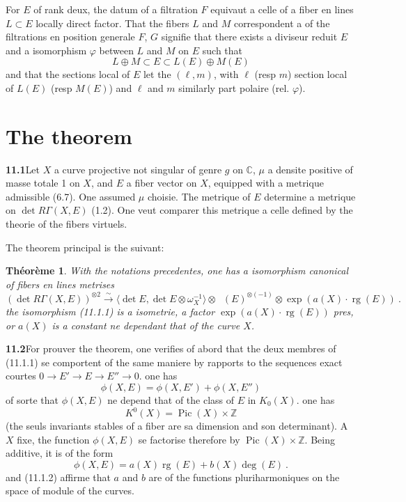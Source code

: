 \documentclass[12pt,a4paper]{article}
\theoremstyle{plain}
\newtheorem{theorem}{Th\'eor\`eme}[section]
\theoremstyle{definition}
\theoremstyle{remark}
\DeclareMathOperator{\Pic}{Pic}
\newcommand{\bbC}{\mathbb{C}}
\newcommand{\bbZ}{\mathbb{Z}}
\DeclareMathOperator{\rg}{rg}
\DeclareMathOperator{\ICtwo}{IC_2}
\newcommand{\simto}{\xrightarrow{\sim}}
\begin{document}
For $E$ of rank deux, the datum of a filtration $F$ equivaut a celle of a fiber en lines $L \subset E$ locally direct factor. That the fibers $L$ and $M$ correspondent a of the filtrations en position generale $F$, $G$ signifie that there exists a diviseur reduit $E$ and a isomorphism $\varphi$ between $L$ and $M$ on $E$ such that
\[
L \oplus M \subset E \subset L(E) \oplus M(E)
\]
and that the sections local of $E$ let the $(\ell, m)$, with $\ell$ (resp $m$) section local of $L(E)$ (resp $M(E)$) and $\ell$ and $m$ similarly part polaire (rel. $\varphi$).


\section{The theorem}

\noindent\textbf{11.1}\quad Let $X$ a curve projective not singular of genre $g$ on $\bbC$, $\mu$ a densite positive of masse totale 1 on $X$, and $E$ a fiber vector on $X$, equipped with a metrique admissible (6.7). One assumed $\mu$ choisie. The metrique of $E$ determine a metrique on $\det R\Gamma(X, E)$ (1.2). One veut comparer this metrique a celle defined by the theorie of the fibers virtuels.

The theorem principal is the suivant:

\begin{theorem}
With the notations precedentes, one has a isomorphism canonical of fibers en lines metrises
\begin{equation}
\label{eq:11.1.1}
(\det R\Gamma(X, E))^{\otimes 2} \simto \langle \det E, \det E \otimes \omega_X^{-1} \rangle \otimes \ICtwo(E)^{\otimes(-1)} \otimes \exp(a(X) \cdot \rg(E)) \ .
\end{equation}
the isomorphism (11.1.1) is a isometrie, a factor $\exp(a(X) \cdot \rg(E))$ pres, or $a(X)$ is a constant ne dependant that of the curve $X$.
\end{theorem}

\medskip
\noindent\textbf{11.2}\quad For prouver the theorem, one verifies of abord that the deux membres of (11.1.1) se comportent of the same maniere by rapports to the sequences exact courtes $0 \to E' \to E \to E'' \to 0$. one has
\[
\phi(X, E) = \phi(X, E') + \phi(X, E'')
\]
of sorte that $\phi(X, E)$ ne depend that of the class of $E$ in $K_0(X)$. one has
\[
K^0(X) = \Pic(X) \times \bbZ
\]
(the seuls invariants stables of a fiber are sa dimension and son determinant). A $X$ fixe, the function $\phi(X, E)$ se factorise therefore by $\Pic(X) \times \bbZ$. Being additive, it is of the form
\[
\phi(X, E) = a(X) \rg(E) + b(X) \deg(E) \ .
\]
and (11.1.2) affirme that $a$ and $b$ are of the functions pluriharmoniques on the space of module of the curves.
\end{document}
